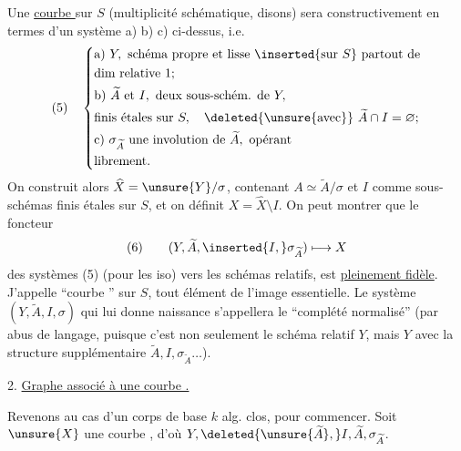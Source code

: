 Une \uline{courbe } sur $S$ (multiplicité schématique, disons) sera  constructivement en termes d'un système a) b) c)  ci-dessus, i.e.
\[
(5)\quad\left\{\begin{aligned}
&\text{a) }Y,\text{ schéma propre et lisse }\inserted{\text{sur }S}\text{ partout de}\\
&\text{dim relative }1;\\
&\text{b) }\widetilde A\text{ et }I,\text{ deux sous-schém. de }Y,\\
&\text{finis étales sur }S,\quad\deleted{\unsure{\text{avec}}}\ \widetilde A\cap I=\varnothing;\\
&\text{c) }\sigma_{\widetilde A}\text{ une involution de }\widetilde A,\text{ opérant}\\
&\text{librement.}
\end{aligned}\right.
\]
On construit alors $\widehat X=\unsure{Y}/\sigma$, contenant $A\simeq\widetilde A/\sigma$ et $I$ comme sous-schémas  finis étales sur $S$, et on définit $X=\widehat X\setminus I$. On peut montrer que le foncteur
\[
(6)\qquad(Y,\widetilde A,\inserted{I,}\sigma_{\widetilde A})\longmapsto X
\]
des systèmes (5) (pour les iso) vers les schémas relatifs,  est \uline{pleinement fidèle}.
J'appelle ``courbe  '' sur $S$, tout élément de l'image essentielle. Le système $(Y,\widetilde A,I,\sigma)$ qui lui donne naissance s'appellera le ``complété normalisé''  (par abus de  langage, puisque c'est non seulement le schéma relatif $Y$, mais $Y$ avec la structure supplémentaire $\widetilde A,I,\sigma_{\widetilde A}\ldots$).

2. \uline{Graphe associé à une courbe .}

Revenons au cas d'un corps de base $k$ alg. clos, pour commencer. Soit $\unsure{X}$ une courbe , d'où $Y,\deleted{\unsure{\widetilde A},}I,\widetilde A,\sigma_{\widetilde A}$.

